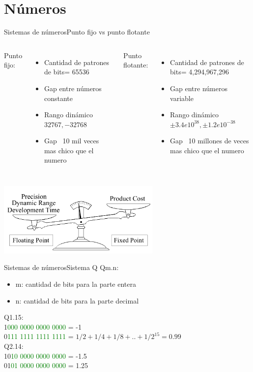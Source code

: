  \section{Números}
 \begin{frame}{Sistemas de números}{Punto fijo vs punto flotante}
    \begin{columns}[onlytextwidth]
    Punto fijo:
       \scriptsize{
    \begin{itemize}
       \item{Cantidad de patrones de bits= 65536}
       \item{Gap entre números constante }
       \item{Rango dinámico $32767, -32768$}
       \item{Gap ~10 mil veces mas chico que el numero}
    \end{itemize}
 }
    Punto flotante:
       \scriptsize{
    \begin{itemize}
       \item{Cantidad de patrones de bits= 4,294,967,296}
       \item{Gap entre números variable }
       \item{Rango dinámico $\pm3.4 e10^{38},  \pm1.2 e10^{-38}$}
       \item{Gap ~10 millones de veces mas chico que el numero}
    \end{itemize}
 }
    \end{columns}
       \center\includegraphics[width=0.6\textwidth]{1_clase/fix_vs_float}
    \vfill
 \end{frame}
 \begin{frame}[c]{Sistemas de números}{Sistema Q}
       Qm.n:
       \begin{itemize}
          \item{m: cantidad de bits para la parte entera}
          \item{n: cantidad de bits para la parte decimal}
       \end{itemize}
       Q1.15: \\
          1\textcolor{green}{000 0000 0000 0000} =  -1 \\
          0\textcolor{green}{111 1111 1111 1111} = $1/2+1/4+1/8+..+1/2^{15} = 0.99$ \\
       Q2.14: \\
          10\textcolor{green}{10 0000 0000 0000} =  -1.5 \\
          01\textcolor{green}{01 0000 0000 0000} =  1.25
    \vfill
 \end{frame}
